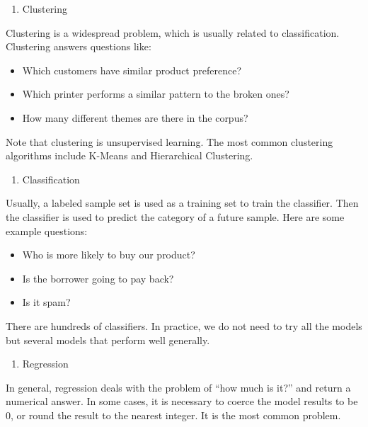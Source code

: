 \documentclass[12pt,]{krantz}
\providecommand{\tightlist}{%
  \setlength{\itemsep}{0pt}\setlength{\parskip}{0pt}}
\theoremstyle{definition}
\theoremstyle{definition}
\theoremstyle{definition}
\theoremstyle{remark}
\begin{document}
\begin{enumerate}
\def\labelenumi{\arabic{enumi}.}
\setcounter{enumi}{2}
\tightlist
\item
  Clustering
\end{enumerate}

Clustering is a widespread problem, which is usually related to
classification. Clustering answers questions like:

\begin{itemize}
\tightlist
\item
  Which customers have similar product preference?
\item
  Which printer performs a similar pattern to the broken ones?
\item
  How many different themes are there in the corpus?
\end{itemize}

Note that clustering is unsupervised learning. The most common
clustering algorithms include K-Means and Hierarchical Clustering.

\begin{enumerate}
\def\labelenumi{\arabic{enumi}.}
\setcounter{enumi}{3}
\tightlist
\item
  Classification
\end{enumerate}

Usually, a labeled sample set is used as a training set to train the
classifier. Then the classifier is used to predict the category of a
future sample. Here are some example questions:

\begin{itemize}
\tightlist
\item
  Who is more likely to buy our product?
\item
  Is the borrower going to pay back?
\item
  Is it spam?
\end{itemize}

There are hundreds of classifiers. In practice, we do not need to try
all the models but several models that perform well generally.

\begin{enumerate}
\def\labelenumi{\arabic{enumi}.}
\setcounter{enumi}{4}
\tightlist
\item
  Regression
\end{enumerate}

In general, regression deals with the problem of ``how much is it?'' and
return a numerical answer. In some cases, it is necessary to coerce the
model results to be 0, or round the result to the nearest integer. It is
the most common problem.
\end{document}
